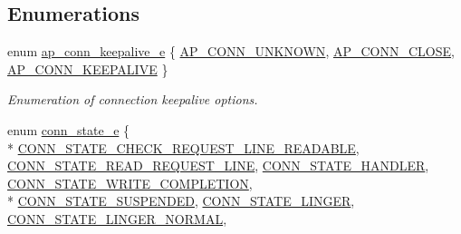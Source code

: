 \subsection*{Enumerations}
\begin{DoxyCompactItemize}
\item 
enum \hyperlink{group__APACHE__CORE__DAEMON_ga0fc39bb8f47f9c1f418f28354416db79}{ap\+\_\+conn\+\_\+keepalive\+\_\+e} \{ \hyperlink{group__APACHE__CORE__DAEMON_gga0fc39bb8f47f9c1f418f28354416db79ac07d9eea5535163a61a1f20669829221}{A\+P\+\_\+\+C\+O\+N\+N\+\_\+\+U\+N\+K\+N\+O\+WN}, 
\hyperlink{group__APACHE__CORE__DAEMON_gga0fc39bb8f47f9c1f418f28354416db79ac991e8ec951fe03c8c2f36495859034d}{A\+P\+\_\+\+C\+O\+N\+N\+\_\+\+C\+L\+O\+SE}, 
\hyperlink{group__APACHE__CORE__DAEMON_gga0fc39bb8f47f9c1f418f28354416db79a874db49e8429c46e82d463014736da01}{A\+P\+\_\+\+C\+O\+N\+N\+\_\+\+K\+E\+E\+P\+A\+L\+I\+VE}
 \}\begin{DoxyCompactList}\small\item\em Enumeration of connection keepalive options. \end{DoxyCompactList}
\item 
enum \hyperlink{group__APACHE__CORE__DAEMON_ga60b752d9a3496ccdcf3c877bd2819d04}{conn\+\_\+state\+\_\+e} \{ \\*
\hyperlink{group__APACHE__CORE__DAEMON_gga60b752d9a3496ccdcf3c877bd2819d04a7d157bf5ef7ec929d3deb7d966cb7829}{C\+O\+N\+N\+\_\+\+S\+T\+A\+T\+E\+\_\+\+C\+H\+E\+C\+K\+\_\+\+R\+E\+Q\+U\+E\+S\+T\+\_\+\+L\+I\+N\+E\+\_\+\+R\+E\+A\+D\+A\+B\+LE}, 
\hyperlink{group__APACHE__CORE__DAEMON_gga60b752d9a3496ccdcf3c877bd2819d04a6730ebad109e49acf371fa7850e1e509}{C\+O\+N\+N\+\_\+\+S\+T\+A\+T\+E\+\_\+\+R\+E\+A\+D\+\_\+\+R\+E\+Q\+U\+E\+S\+T\+\_\+\+L\+I\+NE}, 
\hyperlink{group__APACHE__CORE__DAEMON_gga60b752d9a3496ccdcf3c877bd2819d04ad9a37837199d377aba66188b91a3eda2}{C\+O\+N\+N\+\_\+\+S\+T\+A\+T\+E\+\_\+\+H\+A\+N\+D\+L\+ER}, 
\hyperlink{group__APACHE__CORE__DAEMON_gga60b752d9a3496ccdcf3c877bd2819d04aae6598a74e7d75f2edcfaf6174fbb84d}{C\+O\+N\+N\+\_\+\+S\+T\+A\+T\+E\+\_\+\+W\+R\+I\+T\+E\+\_\+\+C\+O\+M\+P\+L\+E\+T\+I\+ON}, 
\\*
\hyperlink{group__APACHE__CORE__DAEMON_gga60b752d9a3496ccdcf3c877bd2819d04abc94f73d886bd12af6cf8e19f8d76977}{C\+O\+N\+N\+\_\+\+S\+T\+A\+T\+E\+\_\+\+S\+U\+S\+P\+E\+N\+D\+ED}, 
\hyperlink{group__APACHE__CORE__DAEMON_gga60b752d9a3496ccdcf3c877bd2819d04a15944d2aa2dae6f2b1cb7989ef5d36f3}{C\+O\+N\+N\+\_\+\+S\+T\+A\+T\+E\+\_\+\+L\+I\+N\+G\+ER}, 
\hyperlink{group__APACHE__CORE__DAEMON_gga60b752d9a3496ccdcf3c877bd2819d04a56ef135b393c48e435551f1af0f97160}{C\+O\+N\+N\+\_\+\+S\+T\+A\+T\+E\+\_\+\+L\+I\+N\+G\+E\+R\+\_\+\+N\+O\+R\+M\+AL}, 

\end{DoxyCompactItemize}
